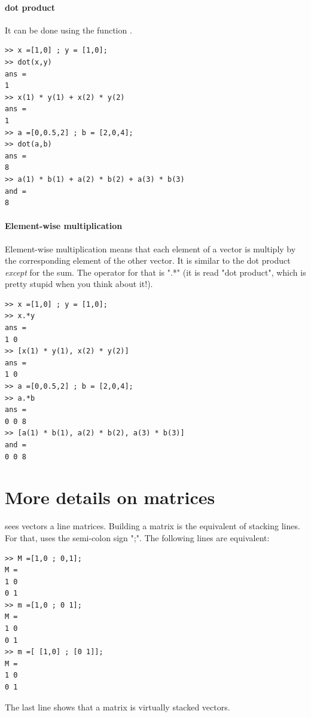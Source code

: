 			\paragraph{dot product}
				It can be done using the function .
\begin{lstlisting}
>> x =[1,0] ; y = [1,0];
>> dot(x,y)
ans = 
1
>> x(1) * y(1) + x(2) * y(2)
ans =
1
>> a =[0,0.5,2] ; b = [2,0,4];
>> dot(a,b)
ans = 
8
>> a(1) * b(1) + a(2) * b(2) + a(3) * b(3)    
and =
8
\end{lstlisting}

			\paragraph{Element-wise multiplication}
				Element-wise multiplication means that each element of a vector is multiply by the corresponding element of the other vector.
				It is similar to the dot product \emph{except} for the sum.
				The operator for that is ".*" (it is read "dot product", which is pretty stupid when you think about it!).
\begin{lstlisting}
>> x =[1,0] ; y = [1,0];
>> x.*y
ans = 
1 0
>> [x(1) * y(1), x(2) * y(2)]
ans =
1 0
>> a =[0,0.5,2] ; b = [2,0,4];
>> a.*b
ans = 
0 0 8
>> [a(1) * b(1), a(2) * b(2), a(3) * b(3)]
and =
0 0 8
\end{lstlisting}





\section{More details on matrices}
	\matlab sees vectors a line matrices. Building a matrix is the equivalent of stacking lines.
	For that, \matlab uses the semi-colon sign ";".
	The following lines are equivalent:
\begin{lstlisting}
>> M =[1,0 ; 0,1];
M = 
1 0
0 1
>> m =[1,0 ; 0 1];
M = 
1 0
0 1
>> m =[ [1,0] ; [0 1]];
M =
1 0
0 1
\end{lstlisting}
	The last line shows that a matrix is virtually stacked vectors.

